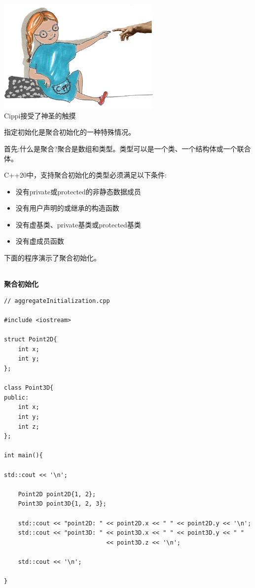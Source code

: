 
\begin{center}
\includegraphics[width=0.6\textwidth]{content/3/chapter4/images/31.png}\\
Cippi接受了神圣的触摸
\end{center}

指定初始化是聚合初始化的一种特殊情况。


首先:什么是聚合?聚合是数组和类型。类型可以是一个类、一个结构体或一个联合体。

C++20中，支持聚合初始化的类型必须满足以下条件:

\begin{itemize}
\item 
没有private或protected的非静态数据成员

\item 
没有用户声明的或继承的构造函数

\item 
没有虚基类、private基类或protected基类

\item 
没有虚成员函数
\end{itemize}

下面的程序演示了聚合初始化。

\hspace*{\fill} \\ %
\noindent
\textbf{聚合初始化}
\begin{lstlisting}[style=styleCXX]
// aggregateInitialization.cpp

#include <iostream>

struct Point2D{
	int x;
	int y;
};

class Point3D{
public:
	int x;
	int y;
	int z;
};

int main(){

std::cout << '\n';

	Point2D point2D{1, 2};
	Point3D point3D{1, 2, 3};
	
	std::cout << "point2D: " << point2D.x << " " << point2D.y << '\n';
	std::cout << "point3D: " << point3D.x << " " << point3D.y << " "
							 << point3D.z << '\n';
	
	std::cout << '\n';

}
\end{lstlisting}

